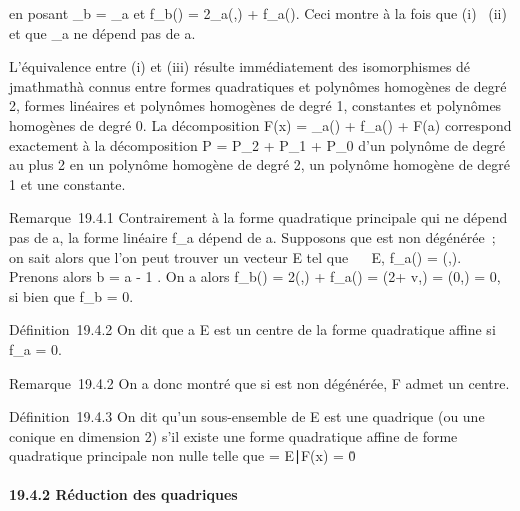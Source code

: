 \documentclass[]{article}
\begin{document}
en posant \Phi_b = \Phi_a et
f_b(\overrightarrow\xi) =
2\phi_a(\overrightarrowab,\overrightarrow\xi)
+ f_a(\overrightarrow\xi). Ceci montre à la
fois que (i) \rigtharrow~(ii) et que \Phi_a ne dépend pas de a.

L'équivalence entre (i) et (iii) résulte immédiatement des isomorphismes
dé\\jmathmathà connus entre formes quadratiques et polynômes homogènes de degré 2,
formes linéaires et polynômes homogènes de degré 1, constantes et
polynômes homogènes de degré 0. La décomposition F(x) =
\Phi_a(\overrightarrowax) +
f_a(\overrightarrowax) + F(a) correspond
exactement à la décomposition P = P_2 + P_1 +
P_0 d'un polynôme de degré au plus 2 en un polynôme homogène de
degré 2, un polynôme homogène de degré 1 et une constante.

Remarque~19.4.1 Contrairement à la forme quadratique principale \Phi qui ne
dépend pas de a, la forme linéaire f_a dépend de a. Supposons
que \Phi est non dégénérée~; on sait alors que l'on peut trouver un vecteur
\vecv \in\vec E tel que
\forall~\vec\xi~
\in\vec E, f_a(\vec\xi) =
\phi(\vecv,\vec\xi). Prenons alors b =
a - 1  \vecv. On a alors
f_b(\vec\xi) =
2\phi(\overrightarrowab,\vec\xi) +
f_a(\vec\xi) =
\phi(2\overrightarrowab +\vec
v,\vec\xi) = \phi(0,\vec\xi) = 0, si
bien que f_b = 0.

Définition~19.4.2 On dit que a \in E est un centre de la forme quadratique
affine si f_a = 0.

Remarque~19.4.2 On a donc montré que si \Phi est non dégénérée, F admet un
centre.

Définition~19.4.3 On dit qu'un sous-ensemble \Sigma de E est une quadrique
(ou une conique en dimension 2) s'il existe une forme quadratique affine
de forme quadratique principale non nulle telle que \Sigma =
\x \in E∣F(x) =
0\.

\paragraph{19.4.2 Réduction des quadriques}
\end{document}
